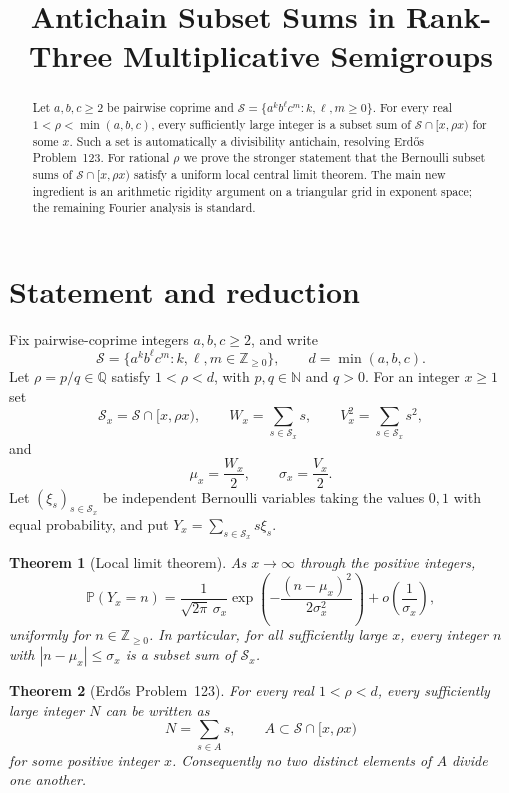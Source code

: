 \documentclass[10pt,reqno]{amsart}
\title[Antichain subset sums]{Antichain Subset Sums in Rank-Three Multiplicative Semigroups}
\author{}
\date{}
\newtheorem{theorem}{Theorem}[section]
\newcommand{\N}{\mathbb N}
\newcommand{\Nzero}{\mathbb Z_{\ge 0}}
\newcommand{\Sg}{\mathcal S}
\newcommand{\Sx}{\mathcal S_x}
\newcommand{\Prob}{\mathbb P}
\begin{document}
\begin{abstract}
Let $a,b,c\ge2$ be pairwise coprime and
$\Sg=\{a^k b^\ell c^m:k,\ell,m\ge0\}$.  For every real
$1<\rho<\min(a,b,c)$, every sufficiently large integer is a subset sum of
$\Sg\cap[x,\rho x)$ for some $x$.  Such a set is automatically a divisibility
antichain, resolving Erd\H{o}s Problem~123.  For rational $\rho$ we prove the
stronger statement that the Bernoulli subset sums of $\Sg\cap[x,\rho x)$ satisfy a
uniform local central limit theorem.  The main new ingredient is an arithmetic
rigidity argument on a triangular grid in exponent space; the remaining
Fourier analysis is standard.
\end{abstract}

\maketitle

\section{Statement and reduction}

Fix pairwise-coprime integers $a,b,c\ge2$, and write
\[
 \Sg=\{a^k b^\ell c^m:k,\ell,m\in\Nzero\},
 \qquad d=\min(a,b,c).
\]
Let $\rho=p/q\in\mathbb Q$ satisfy $1<\rho<d$, with $p,q\in\N$ and $q>0$.
For an integer $x\ge1$ set
\[
 \Sx=\Sg\cap[x,\rho x),\qquad
 W_x=\sum_{s\in\Sx}s,\qquad V_x^2=\sum_{s\in\Sx}s^2,
\]
and
\[
 \mu_x=\frac{W_x}{2},\qquad \sigma_x=\frac{V_x}{2}.
\]
Let $(\xi_s)_{s\in\Sx}$ be independent Bernoulli variables taking the values
$0,1$ with equal probability, and put $Y_x=\sum_{s\in\Sx}s\xi_s$.

\begin{theorem}[Local limit theorem]\label{thm:lclt}
As $x\to\infty$ through the positive integers,
\begin{equation}\label{eq:lclt}
 \Prob(Y_x=n)=\frac{1}{\sqrt{2\pi}\,\sigma_x}
 \exp\!\left(-\frac{(n-\mu_x)^2}{2\sigma_x^2}\right)
 +o\!\left(\frac1{\sigma_x}\right),
\end{equation}
uniformly for $n\in\Nzero$.  In particular, for all sufficiently large $x$,
every integer $n$ with $|n-\mu_x|\le\sigma_x$ is a subset sum of $\Sx$.
\end{theorem}

\begin{theorem}[Erd\H{o}s Problem~123]\label{thm:main}
For every real $1<\rho<d$, every sufficiently large integer $N$ can be written
as
\[
 N=\sum_{s\in A}s,
 \qquad A\subset \Sg\cap[x,\rho x)
\]
for some positive integer $x$.  Consequently no two distinct elements of $A$
divide one another.
\end{theorem}
\end{document}
